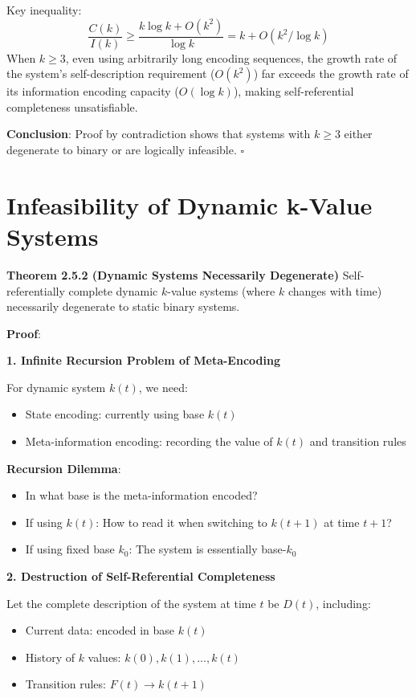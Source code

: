 Key inequality:
\begin{equation}
\frac{C(k)}{I(k)} \geq \frac{k \log k + O(k^2)}{\log k} = k + O(k^2/\log k)
\end{equation}
When $k \geq 3$, even using arbitrarily long encoding sequences, the growth rate of the system's self-description requirement ($O(k^2)$) far exceeds the growth rate of its information encoding capacity ($O(\log k)$), making self-referential completeness unsatisfiable.

\textbf{Conclusion}: Proof by contradiction shows that systems with $k \geq 3$ either degenerate to binary or are logically infeasible. $\square$

\section{Infeasibility of Dynamic k-Value Systems}
\label{sec:ch02_encoding:infeasibility-of-dynamic-k-value-systems}

\textbf{Theorem 2.5.2 (Dynamic Systems Necessarily Degenerate)}
\label{thm:2.5.2}
Self-referentially complete dynamic $k$-value systems (where $k$ changes with time) necessarily degenerate to static binary systems.

\textbf{Proof}:

\textbf{1. Infinite Recursion Problem of Meta-Encoding}

For dynamic system $k(t)$, we need:
\begin{itemize}
\item State encoding: currently using base $k(t)$
\item Meta-information encoding: recording the value of $k(t)$ and transition rules
\end{itemize}

\textbf{Recursion Dilemma}:
\begin{itemize}
\item In what base is the meta-information encoded?
\item If using $k(t)$: How to read it when switching to $k(t+1)$ at time $t+1$?
\item If using fixed base $k_0$: The system is essentially base-$k_0$
\end{itemize}

\textbf{2. Destruction of Self-Referential Completeness}

Let the complete description of the system at time $t$ be $D(t)$, including:
\begin{itemize}
\item Current data: encoded in base $k(t)$
\item History of $k$ values: ${k(0), k(1), ..., k(t)}$
\item Transition rules: $F(t) \to k(t+1)$
\end{itemize}


